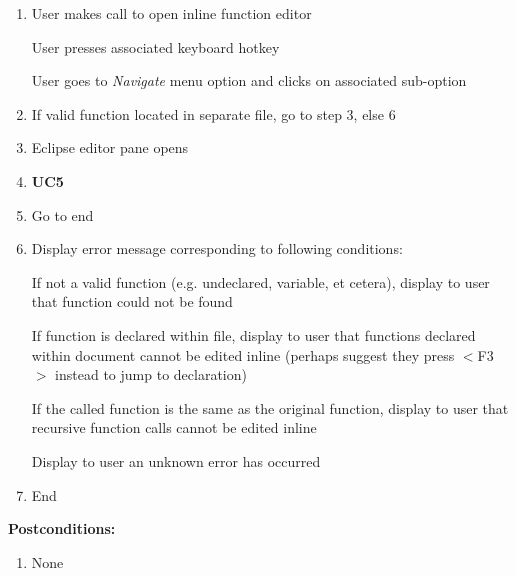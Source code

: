 \documentclass[]{report}
\begin{document}
				\begin{enumerate}
					
					\item
					User makes call to open inline function editor
					
						\subitem
						User presses associated keyboard hotkey
						
						\subitem
						User goes to \textit{Navigate} menu option and clicks on associated sub-option
					
					\item 
					If valid function located in separate file, go to step 3, else 6
					
					\item
					Eclipse editor pane opens
					
					\item 
					\textbf{UC5}
					
					\item 
					Go to end
					
					\item
					Display error message corresponding to following conditions:
					
						\subitem
						If not a valid function (e.g. undeclared, variable, et cetera), display to user that function could not be found
						
						\subitem 
						If function is declared within file, display to user that functions declared within document cannot be edited inline (perhaps suggest they press $<$F3$>$ instead to jump to declaration)
						
						\subitem
						If the called function is the same as the original function, display to user that recursive function calls cannot be edited inline
						
						\subitem
						Display to user an unknown error has occurred
					
					\item 
					End
					
				\end{enumerate}
			
			\noindent\textbf{Postconditions:}
			
				\begin{enumerate}
					
					\item 
					None
					
				\end{enumerate}
			
		\vspace{0.25in}
			
\end{document}
